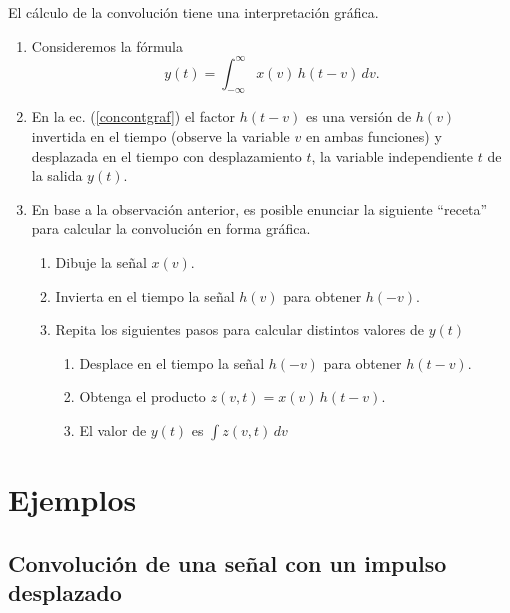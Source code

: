 El c\'{a}lculo de la convolución tiene una interpretaci\'{o}n
gr\'{a}fica.
\begin{enumerate}
\item Consideremos la f\'{o}rmula
  \begin{equation}
    y\left(t\right) = \int_{-\infty }^{\infty }x\left(v\right) \, h\left(t - v\right) \, dv.
    \label{concontgraf}
  \end{equation}
        
\item En la ec. (\ref{concontgraf}) el factor $h(t - v)$ es una
  versi\'{o}n de $h(v)$ invertida en el tiempo (observe la variable
  $v$ en ambas funciones) y desplazada en el tiempo con desplazamiento $t$, la variable independiente $t$ de la salida $y(t)$.
       
        
\item En base a la observación anterior, es posible enunciar la
  siguiente ``receta'' para calcular la convolución en forma
  gr\'{a}fica.
  \begin{enumerate}
  \item Dibuje la se\~{n}al $x(v)$.
                
  \item Invierta en el tiempo la se\~{n}al $h(v)$ para obtener $h(-v)$.
                
  \item Repita los siguientes pasos para calcular distintos valores de
    $y(t)$
    \begin{enumerate}
                
    \item Desplace en el tiempo la se\~{n}al $h(-v)$ para obtener $h(t-v)$.
                        
    \item Obtenga el producto $z(v,t) = x(v) \, h(t - v)$.
                        
    \item El valor de $y(t)$ es $\int z(v,t) \, dv$
                        
    \end{enumerate}
  \end{enumerate}
\end{enumerate}

\section{Ejemplos}


\subsection{Convolución de una señal con un impulso desplazado}

